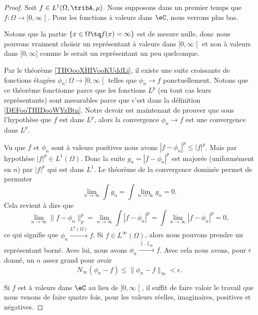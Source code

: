 \begin{proof}
	Soit \( f\in L^1(\Omega,\tribA,\mu)\). Nous supposons dans un premier temps que \( f\colon \Omega\to \mathopen[ 0 , \infty \mathclose[\). Pour les fonctions à valeurs dans \( \eC\), nous verrons plus bas.

	Notons que la partie \( \{ x\in \Omega\tq f(x)=\infty \}\) est de mesure nulle, donc nous pouvons vraiment choisir un représentant à valeurs dans \( \mathopen[ 0 , \infty \mathclose[\) et non à valeurs dans \( \mathopen[ 0 , \infty \mathclose]\) comme le serait un représentant un peu quelconque.

	Par le théorème \ref{THOooXHIVooKUddLi}, il existe une suite croissante de fonctions étagées \( \phi_n\colon \Omega\to \mathopen[ 0 , \infty \mathclose[\) telles que \( \phi_n\to f\) ponctuellement. Notons que ce théorème fonctionne parce que les fonctions \( L^p\) (en tout cas leurs représentants) sont mesurables parce que c'est dans la définition \ref{DEFooTHIDooWYzBtn}.  Notre devoir est maintenant de prouver que sous l'hypothèse que \( f\) est dans \( L^p\), alors la convergence \( \phi_n\to f\) est une convergence dans \( L^p\).

	\begin{subproof}
		Vu que \( f\) et \( \phi_n\) sont à valeurs positives nous avons \( | f-\phi_n |^p\leq | f |^p\). Mais par hypothèse \( | f |^p\in L^1(\Omega)\). Donc la suite \( g_n=| f-\phi_n |^p\) est majorée (uniformément en \( n\)) par \( | f |^p\) qui est dans \( L^1\). Le théorème de la convergence dominée permet de permuter
		\begin{equation}
			\lim_{n\to \infty} \int g_n=\int \lim_{n\to \infty} g_n=0.
		\end{equation}
		Cela revient à dire que
		\begin{equation}
			\lim_{n\to \infty} \| f-\phi_n \|^p_p=\lim_{n\to \infty} \int| f-\phi_n |^p=\int\lim_{n\to \infty} | f-\phi_n |^p=0,
		\end{equation}
		ce qui signifie que \( \phi_n\stackrel{L^p(\Omega)}{\longrightarrow}f\).
		\spitem[Pour \( p=\infty\)]
		Si \( f\in L^{\infty}(\Omega)\), alors nous pouvons prendre un représentant borné. Avec lui, nous avons \( \phi_n\stackrel{\| . \|_{\infty}}{\longrightarrow}f\). Avec cela nous avons, pour \( \epsilon\) donné, un \( n\) assez grand pour avoir
		\begin{equation}
			N_{\infty}(\phi_n-f)\leq \| \phi_n-f \|_{\infty}<\epsilon.
		\end{equation}
	\end{subproof}
	Si \( f\) est à valeurs dans \( \eC\) au lieu de \( \mathopen[ 0 , \infty \mathclose[\), il suffit de faire valoir le travail que nous venons de faire quatre fois, pour les valeurs réelles, imaginaires, positives et négatives.
\end{proof}

